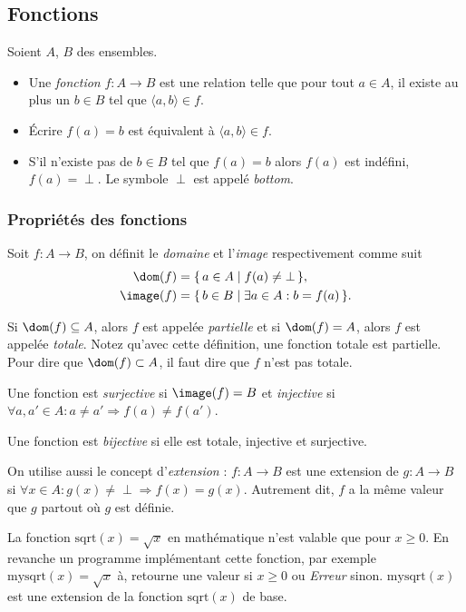 
\subsection{Fonctions}
\label{subsec:fonctions}
Soient $A$, $B$ des ensembles.
\begin{itemize}
  	\item Une \emph{fonction} $f \colon A \rightarrow B$ est une relation telle que pour tout $a \in
	A$, il existe au plus un $b \in B$ tel que $\langle a,b \rangle \in f$.
	\item Écrire $f(a)=b$ est équivalent à $\langle a,b \rangle \in f$.
	\item S'il n'existe pas de $b \in B$ tel que $f(a)=b$ alors $f(a)$ est indéfini,
		$f(a) = \perp$.  Le symbole $\perp$ est appelé \emph{bottom}.
\end{itemize}

\subsubsection{Propriétés des fonctions}
\label{par:proprietes_des_fonctions}
Soit $f\colon A \to B$, on définit le \emph{domaine} et l'\emph{image} respectivement comme suit
\begin{align*}
  \dom(f)   & = \{\, a \in A \mid f(a) \neq \bot \,\},\\
  \image(f) & = \{\, b \in B \mid \exists a \in A : b = f(a) \,\}.
\end{align*}

Si $\dom(f) \subseteq A$, alors $f$ est appelée \emph{partielle} et si $\dom(f) = A$, alors $f$ est appelée \emph{totale}.
Notez qu'avec cette définition, une fonction totale est partielle.
Pour dire que $\dom(f) \subset A$, il faut dire que $f$ n'est pas totale.

Une fonction est \emph{surjective} si $\image(f) = B$ et \emph{injective} si $\forall a,a' \in A : a \neq a' \Rightarrow f(a) \neq f(a')$.

Une fonction est \emph{bijective} si elle est totale, injective et surjective.

On utilise aussi le concept d'\emph{extension} :
$f: A \rightarrow B$ est une extension de $g: A \rightarrow B$ si $\forall x \in A : g(x)\neq \perp \Rightarrow f(x) = g(x)$.
Autrement dit, $f$ a la même valeur que $g$ partout où $g$ est définie.

La fonction $\mathrm{sqrt}(x) = \sqrt{x}$ en mathématique n'est valable que pour $x\geq0$. En revanche un programme implémentant cette fonction, par exemple $\mathrm{mysqrt}(x) = \sqrt{x}$ à, retourne une valeur si $x\geq0$ ou \textit{Erreur} sinon. $\mathrm{mysqrt}(x)$ est une extension de la fonction $\mathrm{sqrt}(x)$ de base.

